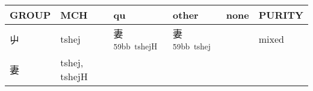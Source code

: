 \documentclass[14pt,a4paper]{scrartcl}
\begin{document}
\begin{longtable}[c]{@{}llllll@{}}
\toprule
\begin{minipage}[b]{0.14\columnwidth}\raggedright\strut
GROUP
\strut\end{minipage} &
\begin{minipage}[b]{0.14\columnwidth}\raggedright\strut
MCH
\strut\end{minipage} &
\begin{minipage}[b]{0.14\columnwidth}\raggedright\strut
qu
\strut\end{minipage} &
\begin{minipage}[b]{0.14\columnwidth}\raggedright\strut
other
\strut\end{minipage} &
\begin{minipage}[b]{0.14\columnwidth}\raggedright\strut
none
\strut\end{minipage} &
\begin{minipage}[b]{0.14\columnwidth}\raggedright\strut
PURITY
\strut\end{minipage}\tabularnewline
\midrule
\endhead
\begin{minipage}[t]{0.14\columnwidth}\raggedright\strut
屮
\strut\end{minipage} &
\begin{minipage}[t]{0.14\columnwidth}\raggedright\strut
tshej
\strut\end{minipage} &
\begin{minipage}[t]{0.14\columnwidth}\raggedright\strut
妻\textsuperscript{59bb~tshejH}
\strut\end{minipage} &
\begin{minipage}[t]{0.14\columnwidth}\raggedright\strut
妻\textsuperscript{59bb~tshej}
\strut\end{minipage} &
\begin{minipage}[t]{0.14\columnwidth}\raggedright\strut
\strut\end{minipage} &
\begin{minipage}[t]{0.14\columnwidth}\raggedright\strut
mixed
\strut\end{minipage}\tabularnewline
\begin{minipage}[t]{0.14\columnwidth}\raggedright\strut
妻
\strut\end{minipage} &
\begin{minipage}[t]{0.14\columnwidth}\raggedright\strut
tshej, tshejH
\strut\end{minipage} &
\begin{minipage}[t]{0.14\columnwidth}\raggedright\strut
\strut\end{minipage} &

\end{longtable}
\end{document}
